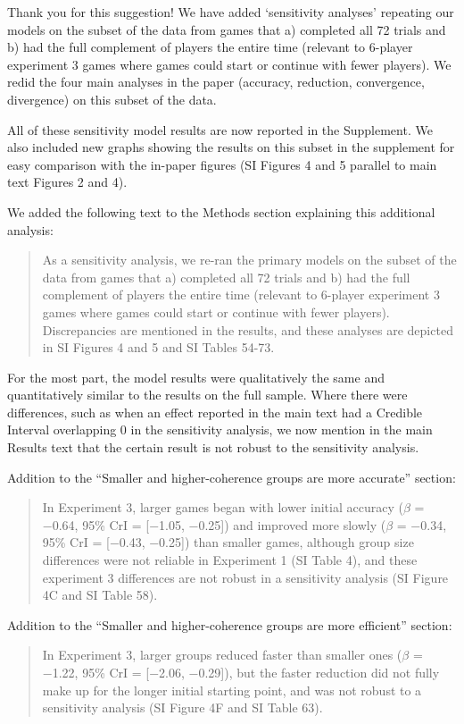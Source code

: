 \documentclass{stanfordletter}
\newcommand{\revised}[1]{\begin{quote}	#1 \end{quote}}
\begin{document}
\begin{letter}{}
          Thank you for this suggestion! We have added `sensitivity analyses' repeating our models on the subset of the data from games that a) completed all 72 trials and b) had the full complement of players the entire time (relevant to 6-player experiment 3 games where games could start or continue with fewer players). We redid the four main analyses in the paper (accuracy, reduction, convergence, divergence) on this subset of the data. 
          
          All of these sensitivity model results are now reported in the Supplement. We also included new graphs showing the results on this subset in the supplement for easy comparison with the in-paper figures (SI Figures 4 and 5 parallel to main text Figures 2 and 4). 
          
          We added the following text to the Methods section explaining this additional analysis:
          

          \revised{As a sensitivity analysis, we re-ran the primary models on the subset of the data from games that a) completed all 72 trials and b) had the full complement of players the entire time (relevant to 6-player experiment 3 games where games could start or continue with fewer players). Discrepancies are mentioned in the results, and these analyses are depicted in SI Figures 4 and 5 and SI Tables 54-73. }
          
          For the most part, the model results were qualitatively the same and quantitatively similar to the results on the full sample. Where there were differences, such as when an effect reported in the main text had a Credible Interval overlapping 0 in the sensitivity analysis, we now mention in the main Results text that the certain result is not robust to the sensitivity analysis. 


          Addition to the ``Smaller and higher-coherence groups are more accurate'' section: 
          \revised{In Experiment 3, larger games began with
          	lower initial accuracy ($\beta$ = −0.64, 95\% CrI = [−1.05, −0.25]) and improved more slowly ($\beta$ =
          	−0.34, 95\% CrI = [−0.43, −0.25]) than smaller games, although group size differences were not
          	reliable in Experiment 1 (SI Table 4), and these experiment 3 differences are not robust in a 
          	sensitivity	analysis (SI	Figure 4C and SI Table 58).}
          
          
          Addition to the ``Smaller and higher-coherence groups are more efficient'' section: 
          \revised{In
          	Experiment 3, larger groups reduced faster than smaller ones ($\beta$ = −1.22, 95\% CrI = [−2.06, −0.29]),
          	but the faster reduction did not fully make up for the longer initial starting point, and was not robust to a sensitivity analysis (SI Figure 4F and SI Table
          	63).}
          	

\end{letter}
\end{document}
